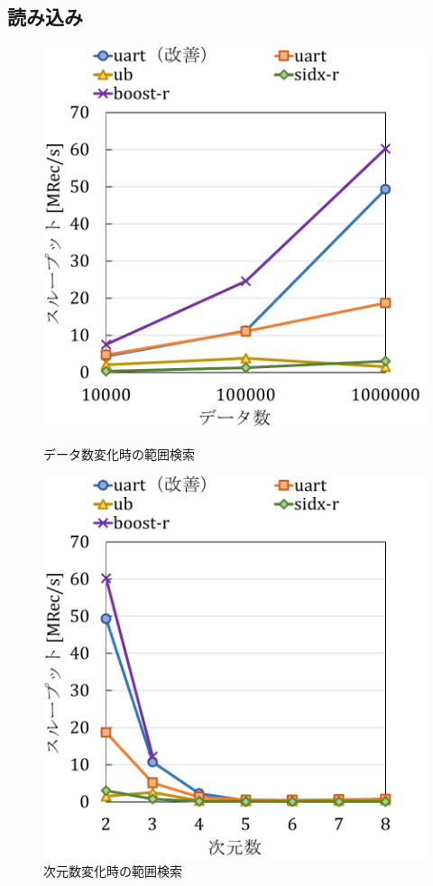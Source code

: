\subsection{読み込み}
\begin{figure}[tb]
  \begin{minipage}[c]{0.495\textwidth}
    \centering
    \includegraphics[scale=0.5]{./figures/graph-scan-datasize.pdf}
    \caption{データ数変化時の範囲検索}
    \label{fig:japan}
  \end{minipage}
  \begin{minipage}[c]{0.495\textwidth}
    \centering
    \includegraphics[scale=0.5]{./figures/graph-scan-dimenntion.pdf}
    \caption{次元数変化時の範囲検索}
    \label{fig:japan}
  \end{minipage}
\end{figure}
